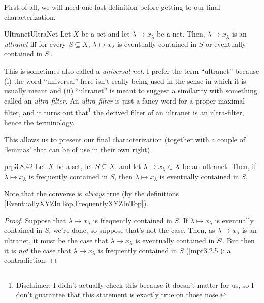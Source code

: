 First of all, we will need one last definition before getting to our final characterization.
\begin{dfn}{Ultranet}{UltraNet}
Let $X$ be a set and let $\lambda \mapsto x_{\lambda}$ be a net.  Then, $\lambda \mapsto x_{\lambda}$ is an \emph{ultranet} iff for every $S\subseteq X$, $\lambda \mapsto x_{\lambda}$ is eventually contained in $S$ or eventually contained in $S^{\comp}$.
\begin{rmk}
This is sometimes also called a \emph{universal net}.  I prefer the term ``ultranet'' because (i) the word ``universal'' here isn't really being used in the sense in which it is usually meant and (ii) ``ultranet'' is meant to suggest a similarity with something called an \emph{ultra-filter}.  An \emph{ultra-filter} is just a fancy word for a proper maximal filter, and it turns out that\footnote{Disclaimer:  I didn't actually check this because it doesn't matter for us, so I don't guarantee that this statement is exactly true on those nose.} the derived filter of an ultranet is an ultra-filter, hence the terminology.
\end{rmk}
\end{dfn}
This allows us to present our final characterization (together with a couple of `lemmas' that can be of use in their own right).
\begin{prp}{}{prp3.8.42}
Let $X$ be a set, let $S\subseteq X$, and let $\lambda \mapsto x_{\lambda}\in X$ be an ultranet.  Then, if $\lambda \mapsto x_{\lambda}$ is frequently contained in $S$, then $\lambda \mapsto x_{\lambda}$ is eventually contained in $S$.
\begin{rmk}
Note that the converse is \emph{always} true (by the definitions \cref{EventuallyXYZInTop,FrequentlyXYZInTop}).
\end{rmk}
\begin{proof}
Suppose that $\lambda \mapsto x_{\lambda}$ is frequently contained in $S$.  If $\lambda \mapsto x_{\lambda}$ is eventually contained in $S$, we're done, so suppose that's not the case.  Then, as $\lambda \mapsto x_{\lambda}$ is an ultranet, it must be the case that $\lambda \mapsto x_{\lambda}$ is eventually contained in $S^{\comp}$.  But then it is \emph{not} the case that $\lambda \mapsto x_{\lambda}$ is frequently contained in $S$ (\cref{mpr3.2.5}):  a contradiction.
\end{proof}
\end{prp}
